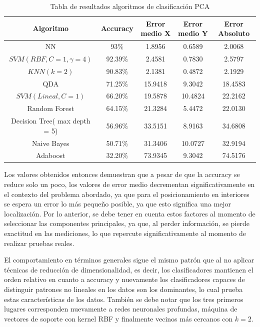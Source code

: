 \begin{table}[ht!]
\centering
\caption[Tabla de resultados algoritmos de clasificación PCA]{Tabla de resultados algoritmos de clasificación PCA}
\label{tabla-pca}
\begin{tabular}{|c|c|c|c|c|}
\hline
Algoritmo                     & Accuracy & Error medio X & Error medio Y & Error Absoluto \\ \hline
NN                            & 93\%  & 1.8956        & 0.6589        & 2.0068         \\ \hline
$SVM(RBF, C=1, \gamma = 4)$   & 92.39\%  & 2.4581  & 0.7830        & 2.5797         \\ \hline
$KNN(k = 2)$                  & 90.83\%  & 2.1381 & 0.4872        & 2.1929         \\ \hline
QDA                           & 71.25\%  & 15.9418 & 9.3042        & 18.4583         \\ \hline
$SVM(Lineal, C=1)$            & 66.20\%  & 19.5878 & 10.4824        & 22.2162        \\ \hline
Random Forest                 & 64.15\%  & 21.3284 & 5.4472        & 22.0130       \\ \hline
Decision Tree( max depth = 5) & 56.96\%  & 33.5151       & 8.9163       & 34.6808        \\ \hline
Naive Bayes                   & 50.71\%  & 31.3406 & 10.0727        & 32.9194        \\ \hline
Adaboost                      & 32.20\%  & 73.9345 & 9.3042       & 74.5176       \\ \hline
\end{tabular}
\end{table}

Los valores obtenidos entonces demuestran que a pesar de que la accuracy se reduce solo un poco, los valores de error medio decrementan significativamente en el contexto del problema abordado, ya que para el posicionamiento en interiores se espera un error lo más pequeño posible, ya que esto significa una mejor localización. Por lo anterior, se debe tener en cuenta estos factores al momento de seleccionar las componentes principales, ya que, al perder información, se pierde exactitud en las mediciones, lo que repercute significativamente al momento de realizar pruebas reales. 

El comportamiento en términos generales sigue el mismo patrón que al no aplicar técnicas de reducción de dimensionalidad, es decir, los clasificadores mantienen el orden relativo en cuanto a accuracy y nuevamente los clasificadores capaces de distinguir patrones no lineales en los datos son los dominantes, lo cual prueba estas características de los datos. También se debe notar que los tres primeros lugares corresponden nuevamente a redes neuronales profundas, máquina de vectores de soporte con kernel RBF y finalmente vecinos más cercanos con $k=2$. 

